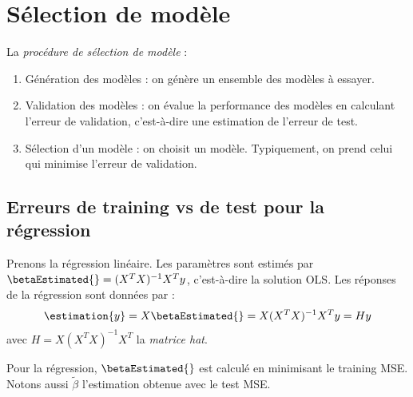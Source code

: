 \section{Sélection de modèle}
    \begin{definition}
        La \textit{procédure de sélection de modèle} :
        \begin{enumerate}
            \item Génération des modèles : on génère un ensemble des modèles à essayer.
            \item Validation des modèles : on évalue la performance des modèles en calculant l'erreur de validation, c'est-à-dire une estimation de l'erreur de test.
            \item Sélection d'un modèle : on choisit un modèle. Typiquement, on prend celui qui minimise l'erreur de validation.
        \end{enumerate}
    \end{definition}

    \subsection{Erreurs de training vs de test pour la régression}
        Prenons la régression linéaire. Les paramètres sont estimés par \(\betaEstimated{} = (X^TX)^{-1}X^Ty\), c'est-à-dire la solution OLS. Les réponses de la régression sont données par :
        \[\estimation{y} = X\betaEstimated{} = X(X^TX)^{-1} X^T y = Hy\]
        avec \(H = X(X^T X)^{-1} X^T\) la \textit{matrice hat}.

        Pour la régression, \(\betaEstimated{}\) est calculé en minimisant le training MSE. Notons aussi \(\widetilde{\beta}\) l'estimation obtenue avec le test MSE.
        
